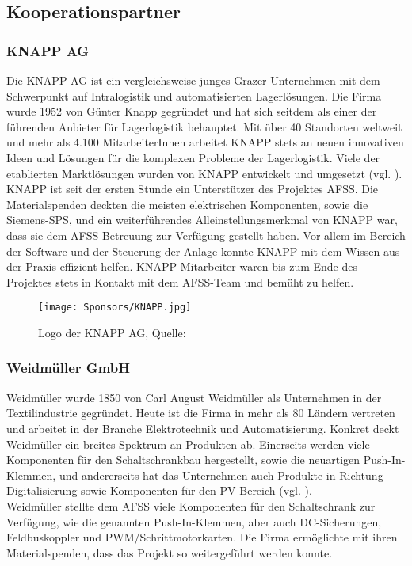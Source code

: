 \subsection{Kooperationspartner}

\subsubsection{KNAPP AG}
Die KNAPP AG ist ein vergleichsweise junges Grazer Unternehmen mit dem Schwerpunkt auf Intralogistik und automatisierten Lagerlösungen. Die Firma wurde 1952 von Günter Knapp gegründet und hat sich seitdem als einer der führenden Anbieter für Lagerlogistik behauptet. Mit über 40 Standorten weltweit und mehr als 4.100 MitarbeiterInnen arbeitet KNAPP stets an neuen innovativen Ideen und Lösungen für die komplexen Probleme der Lagerlogistik. Viele der etablierten Marktlösungen wurden von KNAPP entwickelt und umgesetzt (vgl. \cite{knapp}).\\
KNAPP ist seit der ersten Stunde ein Unterstützer des Projektes AFSS. Die Materialspenden deckten die meisten elektrischen Komponenten, sowie die Siemens-SPS, und ein weiterführendes Alleinstellungsmerkmal von KNAPP war, dass sie dem AFSS-Betreuung zur Verfügung gestellt haben. Vor allem im Bereich der Software und der Steuerung der Anlage konnte KNAPP mit dem Wissen aus der Praxis effizient helfen. KNAPP-Mitarbeiter waren bis zum Ende des Projektes stets in Kontakt mit dem AFSS-Team und bemüht zu helfen.

\begin{figure}[H]
    \centering
    \texttt{[image: Sponsors/KNAPP.jpg]}
    \caption{Logo der KNAPP AG, Quelle: \cite{knapp_logo}}
    \label{fig:knapp_logo}
\end{figure}


\subsubsection{Weidmüller GmbH}

Weidmüller wurde 1850 von Carl August Weidmüller als Unternehmen in der Textilindustrie gegründet. Heute ist die Firma in mehr als 80 Ländern vertreten und arbeitet in der Branche Elektrotechnik und Automatisierung. Konkret deckt Weidmüller ein breites Spektrum an Produkten ab. Einerseits werden viele Komponenten für den Schaltschrankbau hergestellt, sowie die neuartigen Push-In-Klemmen, und andererseits hat das Unternehmen auch Produkte in Richtung Digitalisierung sowie Komponenten für den PV-Bereich (vgl. \cite{weidmueller}).\\
Weidmüller stellte dem AFSS viele Komponenten für den Schaltschrank zur Verfügung, wie die genannten Push-In-Klemmen, aber auch DC-Sicherungen, Feldbuskoppler und PWM/Schrittmotorkarten. Die Firma ermöglichte mit ihren Materialspenden, dass das Projekt so weitergeführt werden konnte. 

